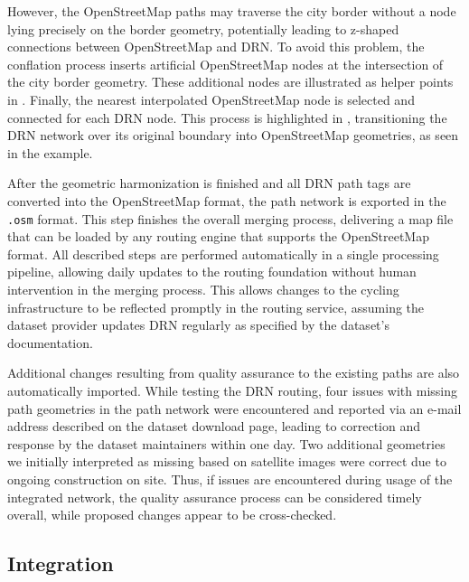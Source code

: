 However, the OpenStreetMap paths may traverse the city border without a node lying precisely on the border geometry, potentially leading to z-shaped connections between OpenStreetMap and DRN. To avoid this problem, the conflation process inserts artificial OpenStreetMap nodes at the intersection of the city border geometry. These additional nodes are illustrated as helper points in . Finally, the nearest interpolated OpenStreetMap node is selected and connected for each DRN node. This process is highlighted in , transitioning the DRN network over its original boundary into OpenStreetMap geometries, as seen in the example.

After the geometric harmonization is finished and all DRN path tags are converted into the OpenStreetMap format, the path network is exported in the \texttt{.osm} format. This step finishes the overall merging process, delivering a map file that can be loaded by any routing engine that supports the OpenStreetMap format. All described steps are performed automatically in a single processing pipeline, allowing daily updates to the routing foundation without human intervention in the merging process. This allows changes to the cycling infrastructure to be reflected promptly in the routing service, assuming the dataset provider updates DRN regularly as specified by the dataset's documentation. 

Additional changes resulting from quality assurance to the existing paths are also automatically imported. While testing the DRN routing, four issues with missing path geometries in the path network were encountered and reported via an e-mail address described on the dataset download page, leading to correction and response by the dataset maintainers within one day. Two additional geometries we initially interpreted as missing based on satellite images were correct due to ongoing construction on site. Thus, if issues are encountered during usage of the integrated network, the quality assurance process can be considered timely overall, while proposed changes appear to be cross-checked.

\subsection{Integration}

